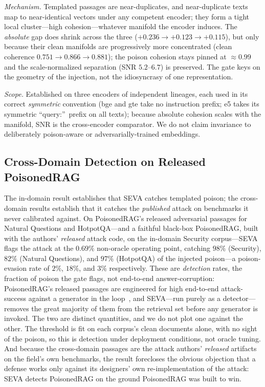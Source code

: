 \documentclass[10pt,journal,compsoc]{IEEEtran}
\begin{document}
\emph{Mechanism.} Templated passages are near-duplicates, and near-duplicate texts map
to near-identical vectors under any competent encoder; they form a tight local
cluster---high cohesion---whatever manifold the encoder induces. The \emph{absolute}
gap does shrink across the three ($+0.236 \to +0.123 \to +0.115$), but only because
their clean manifolds are progressively more concentrated (clean coherence
$0.751 \to 0.866 \to 0.881$); the poison cohesion stays pinned at $\approx 0.99$ and
the scale-normalized separation (SNR $5.2$--$6.7$) is preserved. The gate keys on the
geometry of the injection, not the idiosyncrasy of one representation.

\emph{Scope.} Established on three encoders of independent lineages, each used in its
correct \emph{symmetric} convention (bge and gte take no instruction prefix; e5 takes
its symmetric ``query:''\ prefix on all texts); because absolute cohesion scales with
the manifold, SNR is the cross-encoder comparator. We do not claim invariance to
deliberately poison-aware or adversarially-trained embeddings.

\subsection{Cross-Domain Detection on Released PoisonedRAG}
The in-domain result establishes that SEVA catches templated poison; the
cross-domain results establish that it catches the \emph{published} attack on
benchmarks it never calibrated against. On PoisonedRAG's released adversarial
passages for Natural Questions and HotpotQA---and a faithful black-box PoisonedRAG,
built with the authors' \emph{released} attack code, on the in-domain Security
corpus---SEVA flags
the attack at the $0.69\%$ non-oracle operating point, catching $98\%$ (Security),
$82\%$ (Natural Questions), and $97\%$ (HotpotQA) of the injected poison---a poison-evasion rate of $2\%$, $18\%$, and $3\%$
respectively. These are \emph{detection} rates, the fraction of poison the gate
flags, not end-to-end answer-corruption: PoisonedRAG's released passages are
engineered for high end-to-end attack-success against a generator in the
loop~\cite{poisonedrag}, and SEVA---run purely as a detector---removes the great
majority of them from the retrieval set before any generator is invoked. The two are
distinct quantities, and we do not plot one against the other.
The threshold is fit on each corpus's clean documents alone, with no sight of the
poison, so this is detection under deployment conditions, not oracle tuning. And
because the cross-domain passages are the attack authors' \emph{released} artifacts
on the field's own benchmarks, the result forecloses the obvious objection that a
defense works only
against its designers' own re-implementation of the attack: SEVA detects
PoisonedRAG on the ground PoisonedRAG was built to win.
\end{document}

